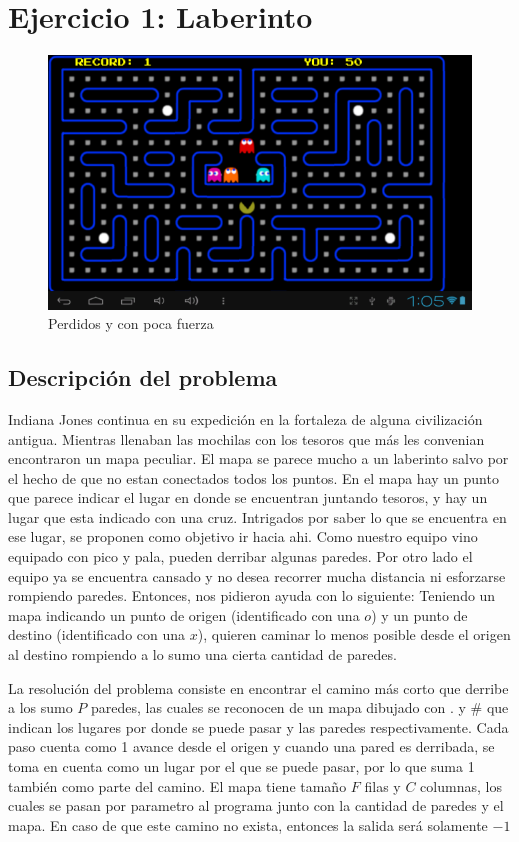 \section{Ejercicio 1: Laberinto}

  \begin{figure}[ht]
    \begin{center}
      \includegraphics[width=0.5\columnwidth]{imagenes/pacman.png}
      \caption{Perdidos y con poca fuerza}
    \end{center}
  \end{figure}

    \subsection{Descripción del problema}
		    Indiana Jones continua en su expedición en la fortaleza de alguna civilización antigua. Mientras llenaban las mochilas con los tesoros que más les convenian encontraron un mapa peculiar. El mapa se parece mucho a un laberinto salvo por el hecho de que no estan conectados todos los puntos. En el mapa hay un punto que parece indicar el lugar en donde se encuentran juntando tesoros, y hay un lugar que esta indicado con una cruz. Intrigados por saber lo que se encuentra en ese lugar, se proponen como objetivo ir hacia ahi. Como nuestro equipo vino equipado con pico y pala, pueden derribar algunas paredes. Por otro lado el equipo ya se encuentra cansado y no desea recorrer mucha distancia ni esforzarse rompiendo paredes. Entonces, nos pidieron ayuda con lo siguiente: Teniendo un mapa indicando un punto de origen (identificado con una $o$) y un punto de destino (identificado con una $x$), quieren caminar lo menos posible desde el origen al destino rompiendo a lo sumo una cierta cantidad de paredes.

        La resolución del problema consiste en encontrar el camino más corto que derribe a los sumo $P$ paredes, las cuales se reconocen de un mapa dibujado con $.$ y $\#$ que indican los lugares por donde se puede pasar y las paredes respectivamente. Cada paso cuenta como 1 avance desde el origen y cuando una pared es derribada, se toma en cuenta como un lugar por el que se puede pasar, por lo que suma 1 también como parte del camino. El mapa tiene tamaño $F$ filas y $C$ columnas, los cuales se pasan por parametro al programa junto con la cantidad de paredes y el mapa. En caso de que este camino no exista, entonces la salida será solamente $-1$

